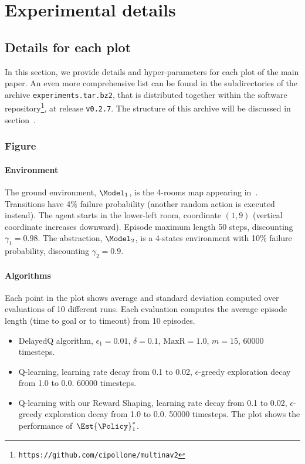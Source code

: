 \section{Experimental details}


\subsection{Details for each plot}

In this section, we provide details and hyper-parameters for each plot of the main paper.
An even more comprehensive list can be found in the subdirectories of the archive \verb|experiments.tar.bz2|,
that is distributed together within the software repository\footnote{\texttt{https://github.com/cipollone/multinav2}},
at release \verb|v0.2.7|.
The structure of this archive will be discussed in section~.

\subsubsection*{Figure~}
\paragraph{Environment}
The ground environment, $\Model_1$, is the 4-rooms map appearing in~\cite{sutton1999between,abel_2020_ValuePreserving}.
Transitions have 4\% failure probability (another random action is executed instead).
The agent starts in the lower-left room, coordinate $(1, 9)$ (vertical coordinate increases downward).
Episode maximum length 50 steps, discounting $\gamma_1 = 0.98$.
The abstraction, $\Model_2$, is a 4-states environment with 10\% failure probability, discounting $\gamma_2 = 0.9$.

\paragraph{Algorithms}
Each point in the plot shows average and standard deviation computed over evaluations of 10 different runs.
Each evaluation computes the average episode length (time to goal or to timeout) from 10 episodes.
\begin{itemize}
	\item DelayedQ algorithm,
		$\epsilon_1 = 0.01$, $\delta = 0.1$, $\text{MaxR} = 1.0$, $m = 15$,
		60000 timesteps.
	\item Q-learning,
		learning rate decay from 0.1 to 0.02, 
		$\epsilon$-greedy exploration decay from 1.0 to 0.0.
		60000 timesteps.
	\item Q-learning with our Reward Shaping,
		learning rate decay from 0.1 to 0.02,
		$\epsilon$-greedy exploration decay from 1.0 to 0.0.
		50000 timesteps.
		The plot shows the performance of~$\Est{\Policy}_1^*$.
\end{itemize}


